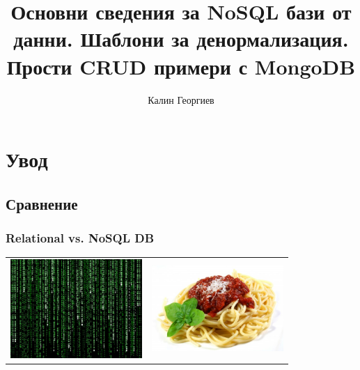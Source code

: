 \documentclass{beamer}
\begin{document}
\title[MongoDB]{Основни сведения за NoSQL бази от данни. Шаблони за денормализация. Прости CRUD примери с MongoDB} 
\author{Калин Георгиев} 
\frame{\titlepage} 

\section{Увод} 
\subsection{Сравнение}


\begin{frame}[fragile]
\frametitle{Relational  vs. NoSQL DB}

\begin{center}
  
\begin{tabular}{ c | c }

\includegraphics[width=5cm]{images/the_matrix}

&

\includegraphics[width=5cm]{images/spaghetti}

\end{tabular}

\end{center}


\end{frame}
\end{document}
